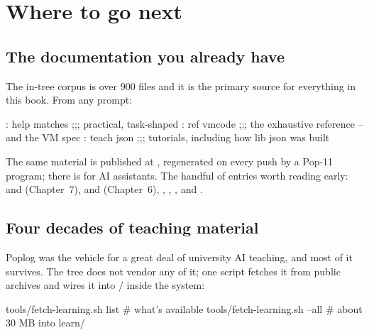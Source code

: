 \chapter{Where to go next}

\section{The documentation you already have}

The in-tree corpus is over 900 files and it is the primary source for
everything in this book. From any prompt:

\begin{repl}
: help matches          ;;; practical, task-shaped
: ref  vmcode           ;;; the exhaustive reference -- and the VM spec
: teach json            ;;; tutorials, including how lib json was built
\end{repl}

The same material is published at
, regenerated on every push by a
Pop-11 program;  there is for AI assistants. The handful of
entries worth reading early:  and 
(Chapter~7),  and  (Chapter~6),
, , , and
.

\section{Four decades of teaching material}

Poplog was the vehicle for a great deal of university AI teaching, and most
of it survives. The tree does not vendor any of it; one script fetches it
from public archives and wires it into / inside the
system:

\begin{sh}
tools/fetch-learning.sh list        # what's available
tools/fetch-learning.sh --all       # about 30 MB into learn/
\end{sh}

